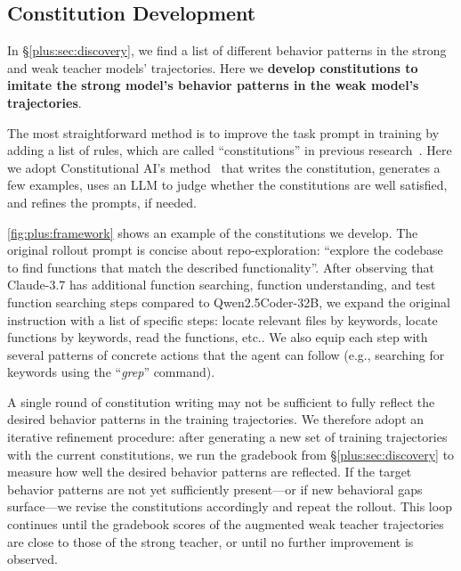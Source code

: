 \subsection{Constitution Development}
\label{plus:sec:augmentation}

In \S\ref{plus:sec:discovery}, we find a list of different behavior patterns in the strong and weak teacher models' trajectories.
Here we \textbf{develop constitutions to imitate the strong model's behavior patterns in the weak model's trajectories}.

The most straightforward method is to improve the task prompt in training by adding a list of rules, which are called ``constitutions'' in previous research~\cite{constitutional-ai}.
Here we adopt Constitutional AI's method~\cite{constitutional-ai} that writes the constitution, generates a few examples, uses an LLM to judge whether the constitutions are well satisfied, and refines the prompts, if needed.

\autoref{fig:plus:framework} shows an example of the constitutions we develop. 
The original rollout prompt is concise about repo-exploration: ``explore the codebase to find functions that match the described functionality''. 
After observing that Claude-3.7 has additional function searching, function understanding, and test function searching steps compared to Qwen2.5Coder-32B, we expand the original instruction with a list of specific steps: locate relevant files by keywords, locate functions by keywords, read the functions, etc.. We also equip each step with several patterns of concrete actions that the agent can follow (e.g., searching for keywords using the ``\textit{grep}'' command).


A single round of constitution writing may not be sufficient to fully reflect the desired behavior patterns in the training trajectories.
We therefore adopt an iterative refinement procedure: after generating a new set of training trajectories with the current constitutions, we run the gradebook from \S\ref{plus:sec:discovery} to measure how well the desired behavior patterns are reflected.
If the target behavior patterns are not yet sufficiently present---or if new behavioral gaps surface---we revise the constitutions accordingly and repeat the rollout.
This loop continues until the gradebook scores of the augmented weak teacher trajectories are close to those of the strong teacher, or until no further improvement is observed.



